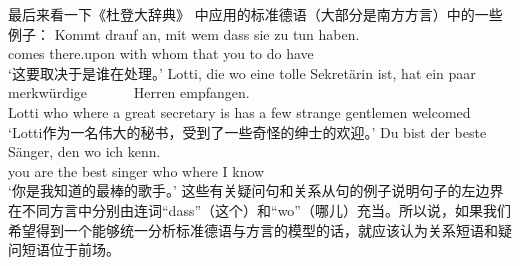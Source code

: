 最后来看一下《杜登大辞典》\citep[§1347]{Duden2005-Authors} 中应用的标准德语（大部分是南方方言）中的一些例子：
\eal
\ex 
\gll Kommt drauf an, mit wem dass sie zu tun haben.\\
     comes there.upon \partic{} with whom that you to do have\\
\glt `这要取决于是谁在处理。'
\zl
\eal
\ex 
\gll Lotti, die wo eine tolle Sekretärin ist, hat ein paar merkwürdige~~~~~~ Herren empfangen.\\
     Lotti  who where a great secretary is has a few strange gentlemen welcomed\\
\glt `Lotti作为一名伟大的秘书，受到了一些奇怪的绅士的欢迎。'
\ex 
\gll Du bist der beste Sänger, den wo ich kenn.\\
     you are the best singer   who where I know\\
\glt `你是我知道的最棒的歌手。'
\zl
这些有关疑问句和关系从句的例子说明句子的左边界在不同方言中分别由连词“dass”（这个）和“wo”（哪儿）充当。所以说，如果我们希望得到一个能够统一分析标准德语与方言的模型的话，就应该认为关系短语和疑问短语位于前场。

